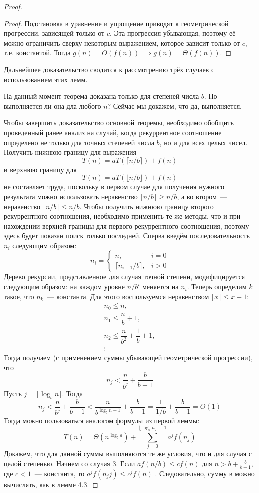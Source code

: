 \documentclass[a4paper,12pt]{article}
\begin{document}
\begin{proof}
\begin{proof}
		Подстановка в уравнение и упрощение приводят к геометрической прогрессии, зависящей только от \(c\). Эта прогрессия убывающая, поэтому её можно ограничить сверху некоторым выражением, которое зависит только от \(c\), т.е. константой. Тогда \(g(n) = O(f(n)) \implies g(n) = \Theta(f(n))\).
	\end{proof}
	Дальнейшее доказательство сводится к рассмотрению трёх случаев с использованием этих лемм.
	
	На данный момент теорема доказана только для степеней числа \(b\). Но выполняется ли она дла любого \(n\)? Сейчас мы докажем, что да, выполняется.
	
	Чтобы завершить доказательство основной теоремы, необходимо обобщить проведенный ранее анализ на случай, когда рекуррентное соотношение определено не только для точных степеней числа \(b\), но и для всех целых чисел. Получить
	нижнюю границу для выражения
	\[T(n) = aT(\lceil n/b \rceil) + f(n)\]
	и верхнюю границу для
	\[T(n) = aT(\lfloor n/b \rfloor) + f(n)\]
	не составляет труда, поскольку в первом случае для получения нужного результата можно использовать неравенство \(\lceil n/b \rceil \geqslant n/b\), а во втором~--- неравенство \(\lfloor n/b \rfloor \leqslant n/b\). Чтобы получить нижнюю границу второго рекуррентного 
	соотношения, необходимо применить те же методы, что и при нахождении верхней границы для первого рекуррентного соотношения, поэтому здесь будет показан поиск только последней. 
	Сперва введём последовательность \(n_i\) следующим образом:
	\[n_i = \begin{cases}
	n, & i = 0 \\
	\lceil n_{i - 1}/b \rceil, & i > 0
	\end{cases}\]
	Дерево рекурсии, представленное для случая точной степени, модифицируется следующим образом: на каждом уровне \(n/b^i\) меняется на \(n_i\). Теперь определим \(k\) такое, что \(n_k\)~--- константа. Для этого воспользуемся неравенством \(\lceil x \rceil \leqslant x + 1\):
	\[\begin{array}{c}
		n_0 \leqslant n, \\
		n_1 \leqslant \dfrac{n}{b} + 1, \\
		n_2 \leqslant \dfrac{n}{b^2} + \dfrac{1}{b} + 1, \\
		\vdots
	\end{array}\]
	Тогда получаем (с применением суммы убывающей геометрической прогрессии), что
	\[n_j < \frac{n}{b^j} + \frac{b}{b - 1}\]
	Пусть \(j = \lfloor \log_b n \rfloor\). Тогда
	\[n_j < \frac{n}{b^j} + \frac{b}{b - 1} < \frac{n}{b^{\log_b n - 1}} + \frac{b}{b - 1} = \frac{1}{1/b} + \frac{b}{b - 1} = O(1)\]
	Тогда можно пользоваться аналогом формулы из первой леммы:
	 \[T(n) = \Theta(n^{\log_b a}) + \sum_{j = 0}^{\lfloor \log_b n \rfloor\ - 1}a^j f(n_j)\]
	 Докажем, что для данной суммы выполняются те же условия, что и для случая с целой степенью. Начнем со случая 3. Если \(af(n/b) \leqslant cf(n)\) для \(n > b + \frac{b}{b - 1}\),
	 где \(c < 1\)~--- константа, то \(a^jf(n_jj) \leqslant c^jf(n)\) . Следовательно, сумму в можно вычислять, как в лемме 4.3. 
	 

\end{proof}
\end{document}
